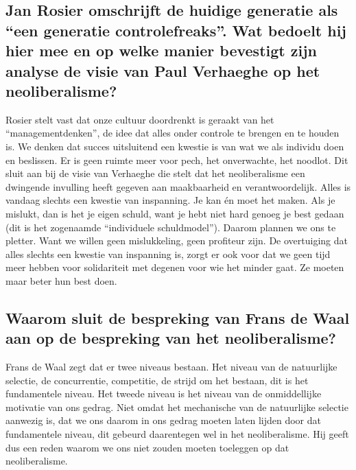\documentclass[11pt,a4paper,titlepage]{article}
\begin{document}
\subsection{Jan Rosier omschrijft de huidige generatie als “een generatie controlefreaks”. Wat bedoelt hij hier mee en op welke manier bevestigt zijn analyse de visie van Paul Verhaeghe op het neoliberalisme?}
Rosier stelt vast dat onze cultuur doordrenkt is geraakt van het “managementdenken”, de idee dat alles onder controle te brengen en te houden is. We denken dat succes uitsluitend een kwestie is van wat we als individu doen en beslissen. Er is geen ruimte meer voor pech, het onverwachte, het noodlot. Dit sluit aan bij de visie van Verhaeghe die stelt dat het neoliberalisme een dwingende invulling heeft gegeven aan maakbaarheid en verantwoordelijk. Alles is vandaag slechts een kwestie van inspanning. Je kan én moet het maken. Als je mislukt, dan is het je eigen schuld, want je hebt niet hard genoeg je best gedaan (dit
is het zogenaamde “individuele schuldmodel”). Daarom plannen we ons te pletter. Want we willen geen mislukkeling, geen profiteur zijn. De overtuiging dat alles slechts een kwestie van inspanning is, zorgt er ook voor dat we geen tijd meer hebben voor solidariteit met degenen voor wie het minder gaat. Ze moeten maar beter hun best doen.

\subsection{Waarom sluit de bespreking van Frans de Waal aan op de bespreking van het neoliberalisme?}
Frans de Waal zegt dat er twee niveaus bestaan. Het niveau van de natuurlijke selectie, de concurrentie, competitie, de strijd om het bestaan, dit is het fundamentele niveau. Het tweede niveau is het niveau van de onmiddellijke motivatie van ons gedrag. Niet omdat het mechanische van de natuurlijke selectie aanwezig is, dat we ons daarom in ons gedrag moeten laten lijden door dat fundamentele niveau, dit gebeurd daarentegen wel in het neoliberalisme. Hij geeft dus een reden waarom we ons niet zouden moeten toeleggen op dat neoliberalisme.
\end{document}
